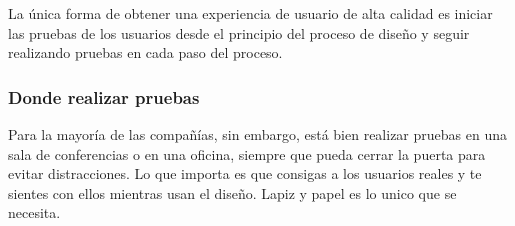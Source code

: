 	\par \noindent
		La única forma de obtener una experiencia de usuario de alta calidad es iniciar las pruebas de los usuarios desde el principio del proceso de diseño y seguir realizando pruebas en cada paso del proceso.
		
\clearpage
\thispagestyle{plain}

	\subsubsection{Donde realizar pruebas}
		\par
			Para la mayoría de las compañías, sin embargo, está bien realizar pruebas en una sala de conferencias o en una oficina, siempre que pueda cerrar la puerta para evitar distracciones. Lo que importa es que consigas a los usuarios reales y te sientes con ellos mientras usan el diseño. Lapiz y papel es lo unico que se necesita.
	